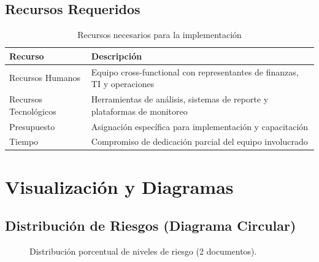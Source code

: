 \documentclass[11pt]{report}
\begin{document}
\section{Recursos Requeridos}
\begin{table}[H]
    \centering
    \begin{tabular}{lp{}}
        \toprule
        \textbf{Recurso} & \textbf{Descripción} \\
        \midrule
        Recursos Humanos & Equipo cross-functional con representantes de finanzas, TI y operaciones \\
        Recursos Tecnológicos & Herramientas de análisis, sistemas de reporte y plataformas de monitoreo \\
        Presupuesto & Asignación específica para implementación y capacitación \\
        Tiempo & Compromiso de dedicación parcial del equipo involucrado \\
        \bottomrule
    \end{tabular}
    \caption{Recursos necesarios para la implementación}
\end{table}


\chapter{Visualización y Diagramas}

\section{Distribución de Riesgos (Diagrama Circular)}

\begin{figure}[H]
    \centering
    \caption{Distribución porcentual de niveles de riesgo (2 documentos).}
\end{figure}
\end{document}
